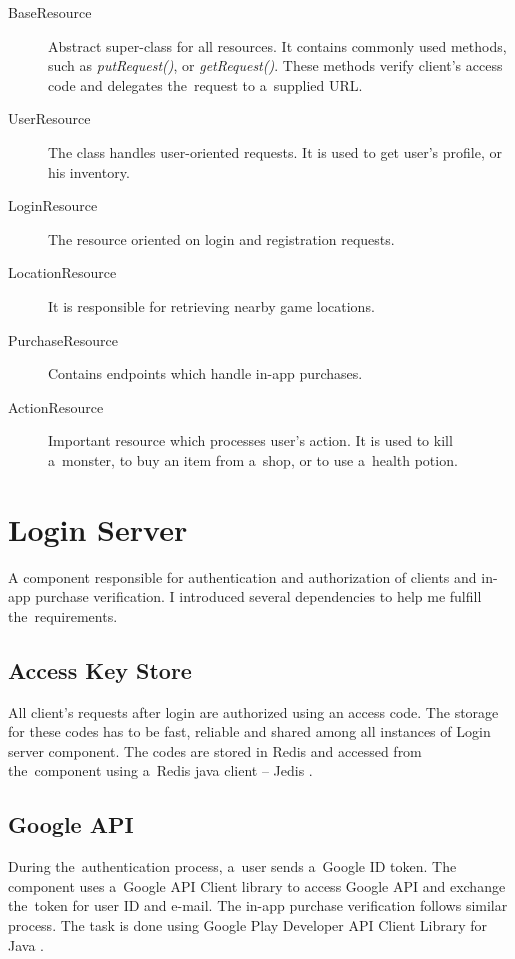 \begin{description}	
	\item[BaseResource] Abstract super-class for all resources. It contains commonly used methods, such as \textit{putRequest()}, or \textit{getRequest()}. These methods verify client's access code and delegates the~request to a~supplied URL.
	
	\item[UserResource] The class handles user-oriented requests. It is used to get user's profile, or his inventory.
	
	\item[LoginResource] The resource oriented on login and registration requests.
	
	\item[LocationResource] It is responsible for retrieving nearby game locations.
	
	\item[PurchaseResource] Contains endpoints which handle in-app purchases.

	\item[ActionResource] Important resource which processes user's action. It is used to kill a~monster, to buy an item from a~shop, or to use a~health potion.
\end{description}

\section{Login Server}
A component responsible for authentication and authorization of clients and in-app purchase verification. I introduced several dependencies to help me fulfill the~requirements.
 
\subsection{Access Key Store}
All client's requests after login are authorized using an access code. The storage for these codes has to be fast, reliable and shared among all instances of Login server component. The codes are stored in Redis and accessed from the~component using a~Redis java client -- Jedis \cite{jedis}. 

\subsection{Google API}
During the~authentication process, a~user sends a~Google ID token. The component uses a~Google API Client library \cite{googleapilibs} to access Google API and exchange the~token for user ID and e-mail. The in-app purchase verification follows similar process. The task is done using Google Play Developer API Client Library for Java  \cite{androidpublisherlibary}.

